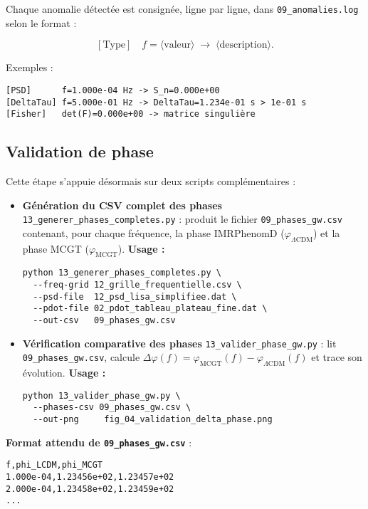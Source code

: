 Chaque anomalie détectée est consignée, ligne par ligne, dans \texttt{09\_anomalies.log} selon le format :

\[
  [\text{Type}]\quad f=\langle\text{valeur}\rangle\;\to\;\langle\text{description}\rangle.
\]

\noindent Exemples :
\begin{verbatim}
[PSD]      f=1.000e-04 Hz -> S_n=0.000e+00
[DeltaTau] f=5.000e-01 Hz -> DeltaTau=1.234e-01 s > 1e-01 s
[Fisher]   det(F)=0.000e+00 -> matrice singulière
\end{verbatim}

\subsection{Validation de phase}\label{subsec:valider_phase}

Cette étape s’appuie désormais sur deux scripts complémentaires :

\begin{itemize}
  \item \textbf{Génération du CSV complet des phases}  
    \texttt{13\_generer\_phases\_completes.py} : produit le fichier  
    \texttt{09\_phases\_gw.csv} contenant, pour chaque fréquence, la phase  
    IMRPhenomD (\(\varphi_{\Lambda\mathrm{CDM}}\)) et la phase MCGT  
    (\(\varphi_{\mathrm{MCGT}}\)).  
    \textbf{Usage :}
    \begin{verbatim}
python 13_generer_phases_completes.py \
  --freq-grid 12_grille_frequentielle.csv \
  --psd-file  12_psd_lisa_simplifiee.dat \
  --pdot-file 02_pdot_tableau_plateau_fine.dat \
  --out-csv   09_phases_gw.csv
    \end{verbatim}

  \item \textbf{Vérification comparative des phases}  
    \texttt{13\_valider\_phase\_gw.py} : lit \texttt{09\_phases\_gw.csv}, calcule  
    \(\Delta\varphi(f)=\varphi_{\mathrm{MCGT}}(f)-\varphi_{\Lambda\mathrm{CDM}}(f)\)  
    et trace son évolution.  
    \textbf{Usage :}
    \begin{verbatim}
python 13_valider_phase_gw.py \
  --phases-csv 09_phases_gw.csv \
  --out-png     fig_04_validation_delta_phase.png
    \end{verbatim}
\end{itemize}

\medskip
\noindent\textbf{Format attendu de \texttt{09\_phases\_gw.csv}} :

\begin{verbatim}
f,phi_LCDM,phi_MCGT
1.000e-04,1.23456e+02,1.23457e+02
2.000e-04,1.23458e+02,1.23459e+02
...
\end{verbatim}

